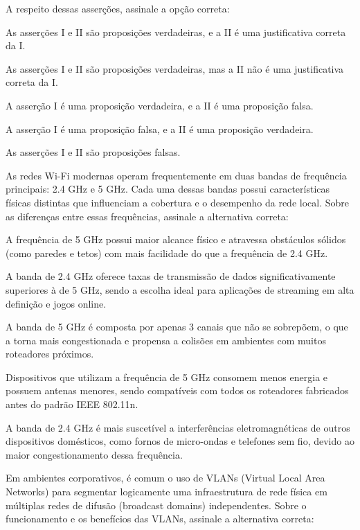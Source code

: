 \documentclass[11pt, addpoints]{modelo/prova2}
\begin{document}
    A respeito dessas asserções, assinale a opção correta:
    \begin{choices}
        \item As asserções I e II são proposições verdadeiras, e a II é uma justificativa correta da I.
        \item As asserções I e II são proposições verdadeiras, mas a II não é uma justificativa correta da I.
        \item A asserção I é uma proposição verdadeira, e a II é uma proposição falsa.
        \item A asserção I é uma proposição falsa, e a II é uma proposição verdadeira.
        \item As asserções I e II são proposições falsas.
    \end{choices} 
\question[0.5] As redes Wi-Fi modernas operam frequentemente em duas bandas de frequência principais: 2.4 GHz e 5 GHz. Cada uma dessas bandas possui características físicas distintas que influenciam a cobertura e o desempenho da rede local. Sobre as diferenças entre essas frequências, assinale a alternativa correta:
    \begin{choices}
        \item A frequência de 5 GHz possui maior alcance físico e atravessa obstáculos sólidos (como paredes e tetos) com mais facilidade do que a frequência de 2.4 GHz.
        \item A banda de 2.4 GHz oferece taxas de transmissão de dados significativamente superiores à de 5 GHz, sendo a escolha ideal para aplicações de streaming em alta definição e jogos online.        
        \item A banda de 5 GHz é composta por apenas 3 canais que não se sobrepõem, o que a torna mais congestionada e propensa a colisões em ambientes com muitos roteadores próximos.
        \item Dispositivos que utilizam a frequência de 5 GHz consomem menos energia e possuem antenas menores, sendo compatíveis com todos os roteadores fabricados antes do padrão IEEE 802.11n.
        \item A banda de 2.4 GHz é mais suscetível a interferências eletromagnéticas de outros dispositivos domésticos, como fornos de micro-ondas e telefones sem fio, devido ao maior congestionamento dessa frequência.
    \end{choices} 
\question[0.5] Em ambientes corporativos, é comum o uso de VLANs (Virtual Local Area Networks) para segmentar logicamente uma infraestrutura de rede física em múltiplas redes de difusão (broadcast domains) independentes. Sobre o funcionamento e os benefícios das VLANs, assinale a alternativa correta:
\end{document}
